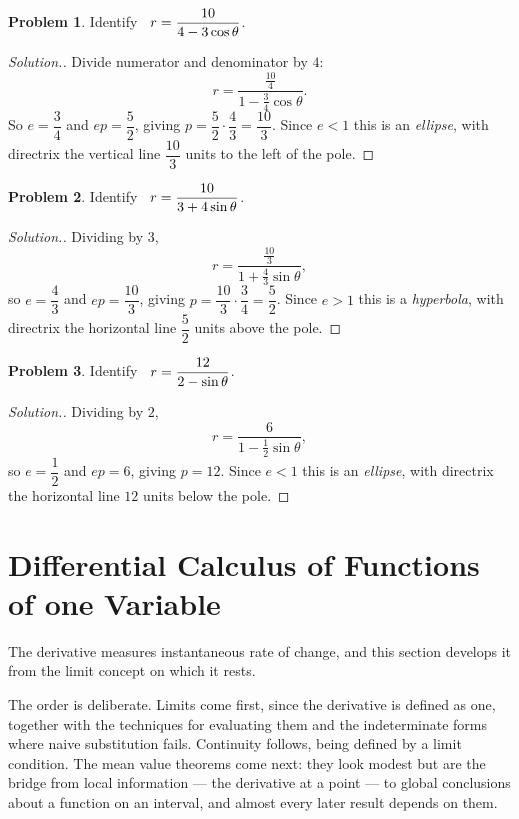 \documentclass[11pt,a4paper]{article}
\theoremstyle{definition}
\newtheorem{problemx}{Problem}[subsection]
\newenvironment{problem}{\begin{problemx}}{\end{problemx}}
\newenvironment{solution}
  {\renewcommand{\qedsymbol}{}\begin{proof}[\textit{Solution}.]}
  {\end{proof}}
\begin{document}
\begin{problem}
Identify $\hspace{0.2cm} r = \dfrac{10}{4 - 3\cos\theta}$.
\end{problem}
\begin{solution}
Divide numerator and denominator by $4$:
$$r = \frac{\frac{10}{4}}{1 - \frac34\cos\theta}.$$
So $e = \dfrac{3}{4}$ and $ep = \dfrac{5}{2}$, giving
$p = \dfrac{5}{2}\cdot\dfrac{4}{3} = \dfrac{10}{3}$. Since $e<1$ this is an
\emph{ellipse}, with directrix the vertical line $\dfrac{10}{3}$ units to the
left of the pole.
\end{solution}

\begin{problem}
Identify $\hspace{0.2cm} r = \dfrac{10}{3 + 4\sin\theta}$.
\end{problem}
\begin{solution}
Dividing by $3$,
$$r = \frac{\frac{10}{3}}{1 + \frac43\sin\theta},$$
so $e = \dfrac{4}{3}$ and $ep = \dfrac{10}{3}$, giving
$p = \dfrac{10}{3}\cdot\dfrac{3}{4} = \dfrac{5}{2}$. Since $e>1$ this is a
\emph{hyperbola}, with directrix the horizontal line $\dfrac{5}{2}$ units above
the pole.
\end{solution}

\begin{problem}
Identify $\hspace{0.2cm} r = \dfrac{12}{2 - \sin\theta}$.
\end{problem}
\begin{solution}
Dividing by $2$,
$$r = \frac{6}{1 - \frac12\sin\theta},$$
so $e = \dfrac{1}{2}$ and $ep = 6$, giving $p = 12$. Since $e<1$ this is an
\emph{ellipse}, with directrix the horizontal line $12$ units below the pole.
\end{solution}




\section{Differential Calculus of Functions of one Variable}

The derivative measures instantaneous rate of change, and this section develops
it from the limit concept on which it rests.

The order is deliberate. Limits come first, since the derivative is defined as
one, together with the techniques for evaluating them and the indeterminate
forms where naive substitution fails. Continuity follows, being defined by a
limit condition. The mean value theorems come next: they look modest but are the
bridge from local information --- the derivative at a point --- to global
conclusions about a function on an interval, and almost every later result
depends on them.
\end{document}
